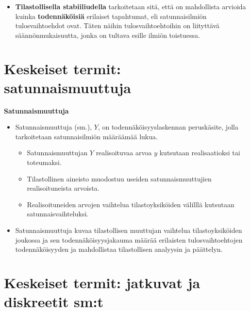 \documentclass[
]{report}
\providecommand{\tightlist}{%
  \setlength{\itemsep}{0pt}\setlength{\parskip}{0pt}}\usepackage{longtable,booktabs,array}
\begin{document}
\begin{itemize}
\tightlist
\item
  \textbf{Tilastollisella stabiiliudella} tarkoitetaan sitä, että on
  mahdollista arvioida kuinka \textbf{todennäköisiä} erilaiset
  tapahtumat, eli satunnaisilmiön tulosvaihtoehdot ovat. Täten näihin
  tulosvaihtoehtoihin on liityttävä säännönmukaisuutta, jonka on tultava
  esille ilmiön toistuessa.
\end{itemize}

\hypertarget{keskeiset-termit-satunnaismuuttuja}{%
\section{Keskeiset termit:
satunnaismuuttuja}\label{keskeiset-termit-satunnaismuuttuja}}

\begin{defblock}{}

\textbf{Satunnaismuuttuja}

\begin{itemize}
\item
  Satunnaismuuttuja (sm.), \(Y\), on todennäköisyyslaskennan
  peruskäsite, jolla tarkoitetaan satunnaisilmiön määräämää lukua.

  \begin{itemize}
  \item
    Satunnaismuuttujan \(Y\) realisoituvaa arvoa \(y\) kutsutaan
    realisaatioksi tai toteumaksi.
  \item
    Tilastollinen aineisto muodostuu useiden satunnaismuuttujien
    realisoituneista arvoista.
  \item
    Realisoituneiden arvojen vaihtelua tilastoyksiköiden välilllä
    kutsutaan satunnaisvaihteluksi.
  \end{itemize}
\end{itemize}

\end{defblock}

\begin{itemize}
\tightlist
\item
  Satunnaismuuttuja kuvaa tilastollisen muuttujan vaihtelua
  tilastoyksiköiden joukossa ja sen todennäköisyysjakauma määrää
  erilaisten tulosvaihtoehtojen todennäköisyyden ja mahdollistaa
  tilastollisen analyysin ja päättelyn.
\end{itemize}

\hypertarget{keskeiset-termit-jatkuvat-ja-diskreetit-smt}{%
\section{Keskeiset termit: jatkuvat ja diskreetit
sm:t}\label{keskeiset-termit-jatkuvat-ja-diskreetit-smt}}
\end{document}
